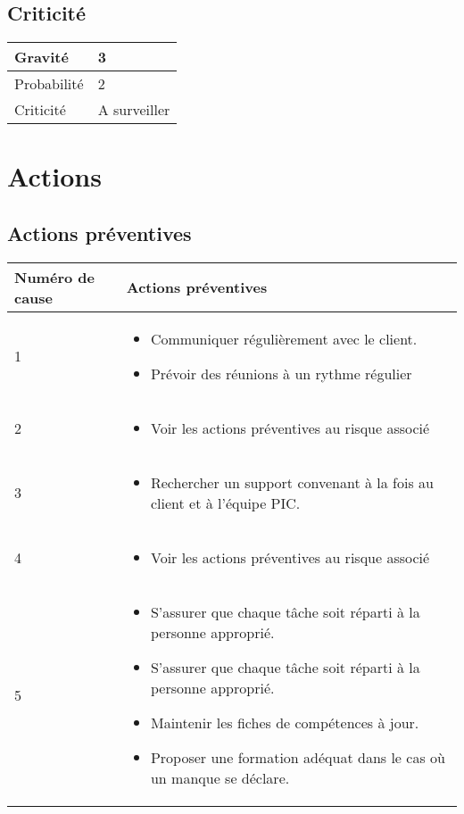 \subsection*{Criticité}

\begin{table}[H]
\centering
	\begin{tabularx}{16.8cm}{|>{\columncolor{gray!40}}X|X|}
	\hline
	Gravité & 3\\
	\hline
	Probabilité & 2\\
	\hline
	Criticité & A surveiller \\
	\hline
	\end{tabularx}
\end{table}
\newpage

\section*{Actions}
\subsection*{Actions préventives}

\centering
	\begin{longtable}{|p{7cm}|p{7cm}|}
	\hline
	\rowcolor{gray!40} Numéro de cause & Actions préventives \\
	\hline
	 1 & \begin{itemize}
	 	\item Communiquer régulièrement avec le client.
	 	\item
	 	Prévoir des réunions à un rythme régulier
	 \end{itemize} \\
	\hline
	2 & \begin{itemize}
		\item Voir les actions préventives au risque associé 
	\end{itemize} \\
	\hline
	3 & \begin{itemize}
		\item Rechercher un support convenant à la fois au client et à l'équipe PIC.
	\end{itemize} \\
	\hline
	4 & \begin{itemize}
		\item Voir les actions préventives au risque associé 
	\end{itemize} \\
	\hline
	5 & \begin{itemize}
		\item S'assurer que chaque tâche soit réparti
à la personne approprié.
	\item
	S'assurer que chaque tâche soit réparti
à la personne approprié.
\item Maintenir les fiches de compétences à jour. 
\item Proposer une formation adéquat dans le cas où un manque se déclare.	
	
	\end{itemize} \\
	\hline
	\end{longtable}

